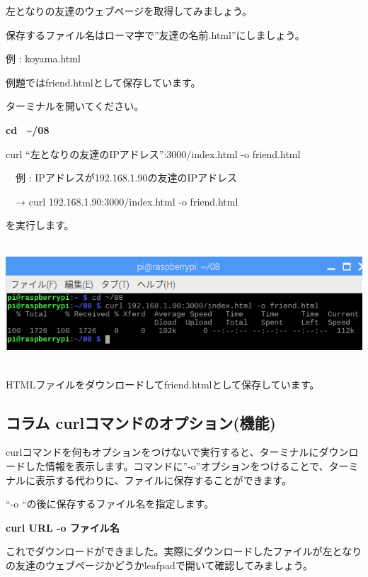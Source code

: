 \documentclass[a4paper,12pt,dvipdfmx]{jarticle}
\begin{document}
左となりの友達のウェブページを取得してみましょう。

保存するファイル名はローマ字で”友達の名前.html”にしましょう。

例 : koyama.html

例題ではfriend.htmlとして保存しています。

ターミナルを開いてください。

\textbf{cd \ \~{}/08}

curl “左となりの友達のIPアドレス”:3000/index.html -o
friend.html

\ \ 例 :
IPアドレスが192.168.1.90の友達のIPアドレス

\ \ → curl 192.168.1.90:3000/index.html -o friend.html

を実行します。

\begin{center}
\includegraphics[width=17.006cm,height=4.553cm]{textbook-img005.png}

\end{center}

\bigskip

HTMLファイルをダウンロードしてfriend.htmlとして保存しています。



\begin{center}
\begin{boxedminipage}{17.228cm}
\section*{コラム
curlコマンドのオプション(機能)}

\bigskip

curlコマンドを何もオプションをつけないで実行すると、ターミナルにダウンロードした情報を表示します。コマンドに”-o”オプションをつけることで、ターミナルに表示する代わりに、ファイルに保存することができます。

“-o
“の後に保存するファイル名を指定します。

	\textbf{curl URL -o ファイル名}
\end{boxedminipage}
\end{center}
\clearpage
これでダウンロードができました。実際にダウンロードしたファイルが左となりの友達のウェブページかどうかleafpadで開いて確認してみましょう。
\end{document}
